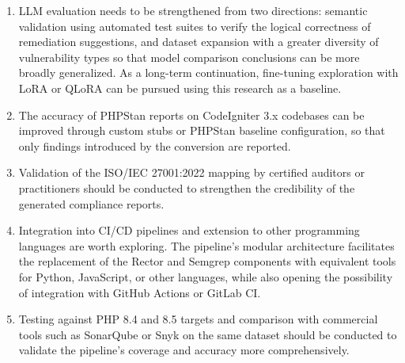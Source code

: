 \begin{enumerate}
    \item LLM evaluation needs to be strengthened from two 
    directions: semantic validation using automated test suites 
    to verify the logical correctness of remediation suggestions, 
    and dataset expansion with a greater diversity of 
    vulnerability types so that model comparison conclusions can 
    be more broadly generalized. As a long-term continuation, 
    fine-tuning exploration with LoRA or QLoRA can be pursued 
    using this research as a baseline.

    \item The accuracy of PHPStan reports on CodeIgniter 3.x 
    codebases can be improved through custom stubs or PHPStan 
    baseline configuration, so that only findings introduced by 
    the conversion are reported.

    \item Validation of the ISO/IEC 27001:2022 mapping by 
    certified auditors or practitioners should be conducted to 
    strengthen the credibility of the generated compliance 
    reports.

    \item Integration into CI/CD pipelines and extension to 
    other programming languages are worth exploring. The 
    pipeline's modular architecture facilitates the replacement 
    of the Rector and Semgrep components with equivalent tools 
    for Python, JavaScript, or other languages, while also 
    opening the possibility of integration with GitHub Actions 
    or GitLab CI.

    \item Testing against PHP 8.4 and 8.5 targets and 
    comparison with commercial tools such as SonarQube or Snyk 
    on the same dataset should be conducted to validate the 
    pipeline's coverage and accuracy more comprehensively.
\end{enumerate}